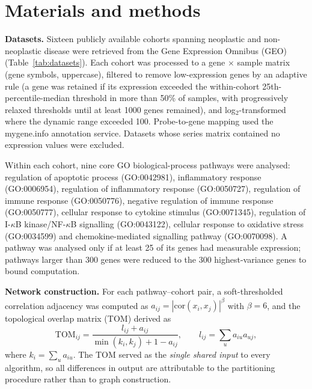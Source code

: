 \documentclass[twocolumn,10pt,a4paper]{article}
\begin{document}
\section{Materials and methods}

\noindent\textbf{Datasets.} Sixteen publicly available cohorts spanning neoplastic and non-neoplastic disease were
retrieved from the Gene Expression Omnibus (GEO) (Table~\ref{tab:datasets}). Each cohort
was processed to a gene $\times$ sample matrix (gene symbols, uppercase), filtered to
remove low-expression genes by an adaptive rule (a gene was retained if its expression
exceeded the within-cohort 25th-percentile-median threshold in more than 50\% of samples,
with progressively relaxed thresholds until at least 1000 genes remained), and
log$_2$-transformed where the dynamic range exceeded 100. Probe-to-gene mapping used the
mygene.info annotation service. Datasets whose series matrix contained no expression
values were excluded.

Within each cohort, nine core GO biological-process pathways were analysed: regulation of
apoptotic process (GO:0042981), inflammatory response (GO:0006954), regulation of
inflammatory response (GO:0050727), regulation of immune response (GO:0050776), negative
regulation of immune response (GO:0050777), cellular response to cytokine stimulus
(GO:0071345), regulation of I-$\kappa$B kinase/NF-$\kappa$B signalling (GO:0043122),
cellular response to oxidative stress (GO:0034599) and chemokine-mediated signalling
pathway (GO:0070098). A pathway was
analysed only if at least 25 of its genes had measurable expression; pathways larger than
300 genes were reduced to the 300 highest-variance genes to bound computation.

\noindent\textbf{Network construction.} For each pathway--cohort pair, a soft-thresholded correlation adjacency was computed as
$a_{ij} = |\mathrm{cor}(x_i,x_j)|^{\beta}$ with $\beta = 6$, and the topological overlap
matrix (TOM) derived as
\begin{equation}
\mathrm{TOM}_{ij} = \frac{l_{ij} + a_{ij}}{\min(k_i,k_j) + 1 - a_{ij}},
\qquad l_{ij} = \sum_u a_{iu}a_{uj},
\end{equation}
where $k_i = \sum_u a_{iu}$. The TOM served as the \emph{single shared input} to every
algorithm, so all differences in output are attributable to the partitioning procedure
rather than to graph construction.
\end{document}
